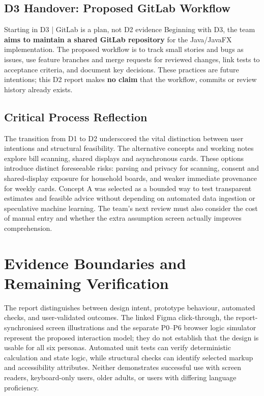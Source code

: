 \documentclass[12pt,a4paper]{article}
\begin{document}
\subsection{D3 Handover: Proposed GitLab Workflow}
\begin{insightbox}{Starting in D3 | GitLab is a plan, not D2 evidence}
Beginning with D3, the team \textbf{aims to maintain a shared GitLab repository} for the Java/JavaFX implementation. The proposed workflow is to track small stories and bugs as issues, use feature branches and merge requests for reviewed changes, link tests to acceptance criteria, and document key decisions. These practices are future intentions; this D2 report makes \textbf{no claim} that the workflow, commits or review history already exists.
\end{insightbox}

\subsection{Critical Process Reflection}
The transition from D1 to D2 underscored the vital distinction between user intentions and structural feasibility. The alternative concepts and working notes explore bill scanning, shared displays and asynchronous cards. These options introduce distinct foreseeable risks: parsing and privacy for scanning, consent and shared-display exposure for household boards, and weaker immediate provenance for weekly cards. Concept A was selected as a bounded way to test transparent estimates and feasible advice without depending on automated data ingestion or speculative machine learning. The team's next review must also consider the cost of manual entry and whether the extra assumption screen actually improves comprehension.

\section{Evidence Boundaries and Remaining Verification}

The report distinguishes between design intent, prototype behaviour, automated checks, and user-validated outcomes. The linked Figma click-through, the report-synchronised screen illustrations and the separate P0--P6 browser logic simulator represent the proposed interaction model; they do not establish that the design is usable for all six personas. Automated unit tests can verify deterministic calculation and state logic, while structural checks can identify selected markup and accessibility attributes. Neither demonstrates successful use with screen readers, keyboard-only users, older adults, or users with differing language proficiency.
\end{document}
